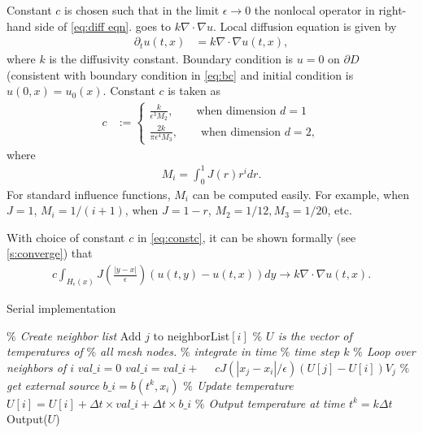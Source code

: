 \documentclass[11pt,twocolumn]{amsart}
\theoremstyle{definition}
\theoremstyle{definition}
\numberwithin{equation}{section}
\numberwithin{equation}{section}
\begin{document}
Constant $c$ is chosen such that in the limit $\epsilon\to 0$ the nonlocal operator in right-hand side of \autoref{eq:diff eqn}. goes to $k\nabla \cdot \nabla u$. Local diffusion equation is given by
\begin{align}\label{eq:locdiff}
\partial_t u(t,x) &= k \nabla \cdot \nabla u(t,x),
\end{align}
where $k$ is the diffusivity constant. Boundary condition is $u = 0$ on $\partial D$ (consistent with boundary condition in \autoref{eq:bc} and initial condition is $u(0,x) = u_0(x)$. Constant $c$ is taken as
\begin{align}\label{eq:constc}
c &:= \begin{cases}
\frac{k}{\epsilon^3 M_2}, \qquad \text{when dimension }d=1 \\
\frac{2k}{\pi\epsilon^4 M_3}, \qquad \text{when dimension }d=2,
\end{cases}
\end{align}
where 
\begin{align}\label{eq:momentJ}
M_i = \int_0^1 J(r) r^i dr.
\end{align}
For standard influence functions, $M_i$ can be computed easily. For example, when $J = 1$, $M_i = 1/(i+1)$, when $J = 1- r$, $M_2 = 1/12, M_3 = 1/20$, etc.

With choice of constant $c$ in \autoref{eq:constc}, it can be shown formally (see \autoref{s:converge}) that
\begin{align}\label{eq:limit}
c \int_{H_\epsilon(x)}  J(\frac{|y-x|}{\epsilon}) (u(t,y) - u(t,x)) dy \to k \nabla \cdot \nabla u(t,x).
\end{align}

\begin{algorithm}[ht]
	\caption{Serial implementation}
	\label{alg:serial}
	\begin{algorithmic}[1]
		\STATE \textcolor{mygray}{\it $\%$ Create neighbor list}
				\STATE Add $j$ to neighborList$[i]$
			\ENDIF
		\ENDFOR
		\STATE
		\STATE \textcolor{mygray}{\it $\%$ $U$ is the vector of temperatures of}
		\STATE \textcolor{mygray}{\it $\%$ all mesh nodes.}
		\STATE
		\STATE \textcolor{mygray}{\it $\%$ integrate in time}
			\STATE \textcolor{mygray}{\it $\%$ time step $k$}
				\STATE \textcolor{mygray}{\it $\%$ Loop over neighbors of $i$}
				\STATE $val\_i = 0$
					\STATE $val\_i = val\_i + $					
					\STATE $\quad c J(|x_j - x_i|/\epsilon) (U[j] - U[i])V_j$
				\ENDFOR
				\STATE \textcolor{mygray}{\it $\%$ get external source}
				\STATE $b\_i = b(t^k, x_i)$
				\STATE \textcolor{mygray}{\it $\%$ Update temperature}
				\STATE $U[i] = U[i] + \Delta t \times val\_i + \Delta t \times b\_i$
			\ENDFOR	
			\STATE \textcolor{mygray}{\it $\%$ Output temperature at time $t^k = k\Delta t$}
			\STATE Output($U$)
		\ENDFOR
	\end{algorithmic}
\end{algorithm}
\end{document}
